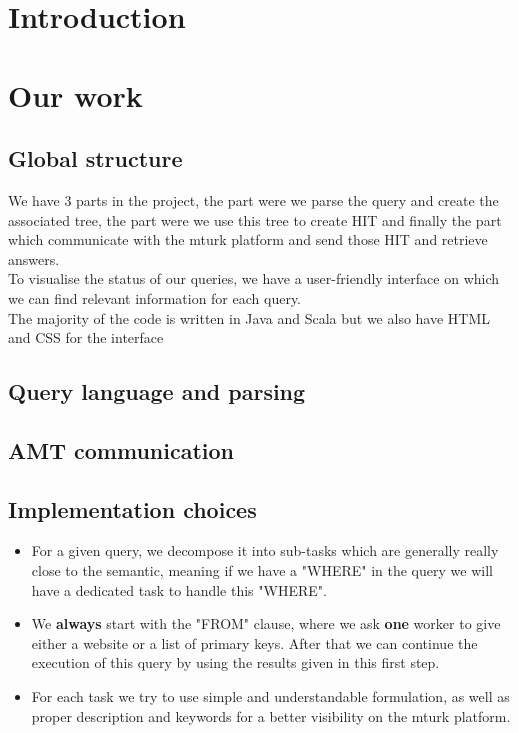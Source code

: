 \documentclass{article}
\begin{document}


\tableofcontents
\newpage


\section{Introduction}



\section{Our work} %
\subsection{Global structure}
We have 3 parts in the project, the part were we parse the query and create the associated tree, the part were we use this tree to create HIT and finally the part which communicate with the mturk platform and send those HIT and retrieve answers.\\
To visualise the status of our queries, we have a user-friendly interface on which we can find relevant information for each query.\\ The majority of the code is written in Java and Scala but we also have HTML and CSS for the interface
\subsection{Query language and parsing}
\subsection{AMT communication}
\subsection{Implementation choices}
\begin{itemize}
\item For a given query, we decompose it into sub-tasks which are generally really close to the semantic, meaning if we have a "WHERE" in the query we will have a dedicated task to handle this "WHERE".
\item We \textbf{always} start with the "FROM" clause, where we ask \textbf{one} worker to give either a website or a list of primary keys. After that we can continue the execution of this query by using the results given in this first step.
\item For each task we try to use simple and understandable formulation, as well as proper description and keywords for a better visibility on the mturk platform. 

\end{itemize}
\end{document}
